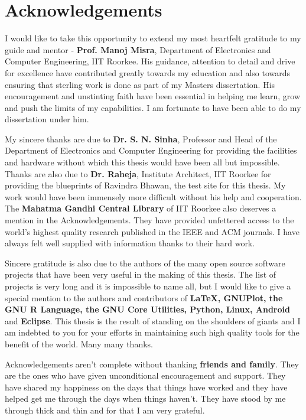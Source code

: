 \chapter{Acknowledgements}

\onehalfspacing

I would like to take this opportunity to extend my most heartfelt gratitude to
my guide and mentor - \textbf{Prof. Manoj Misra}, Department of Electronics and
Computer Engineering, IIT Roorkee. His guidance, attention to detail and drive
for excellence have contributed greatly towards my education and also towards
ensuring that sterling work is done as part of my Masters dissertation. His
encouragement and unstinting faith have been essential in helping me learn, grow
and push the limits of my capabilities. I am fortunate to have been able to do
my dissertation under him.

My sincere thanks are due to \textbf{Dr. S. N. Sinha}, Professor and Head of the
Department of Electronics and Computer Engineering for providing the facilities
and hardware without which this thesis would have been all but impossible.
Thanks are also due to \textbf{Dr. Raheja}, Institute Architect, IIT Roorkee for
providing the blueprints of Ravindra Bhawan, the test site for this thesis. My
work would have been immensely more difficult without his help and cooperation.
The \textbf{Mahatma Gandhi Central Library} of IIT Roorkee also deserves a
mention in the Acknowledgements. They have provided unfettered access to the
world's highest quality research published in the IEEE and ACM journals. I have
always felt well supplied with information thanks to their hard work.

Sincere gratitude is also due to the authors of the many open source software
projects that have been very useful in the making of this thesis. The list of
projects is very long and it is impossible to name all, but I would like to give
a special mention to the authors and contributors of \textbf{\LaTeX, GNUPlot,
the GNU R Language, the GNU Core Utilities, Python, Linux, Android} and
\textbf{Eclipse}. This thesis is the result of standing on the shoulders of
giants and I am indebted to you for your efforts in maintaining such high
quality tools for the benefit of the world. Many many thanks.

Acknowledgements aren't complete without thanking \textbf{friends and family}.
They are the ones who have given unconditional encouragement and support. They
have shared my happiness on the days that things have worked and they have
helped get me through the days when things haven't. They have stood by me
through thick and thin and for that I am very grateful.

